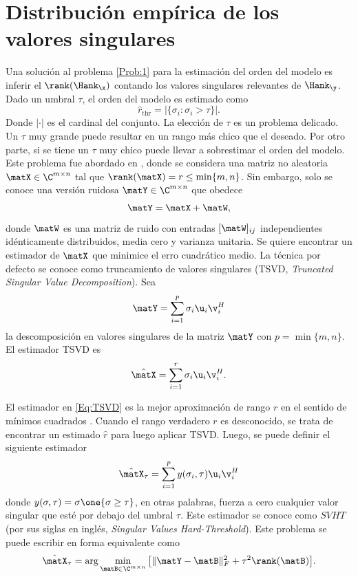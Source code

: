 \section{Distribución empírica de los valores singulares}
	Una solución al problema \eqref{Prob:1} para la estimación del orden del modelo es inferir el $\rank(\Hank_{\x})$ contando los valores singulares relevantes de $\Hank_{\y}$. Dado un umbral $\tau$, el orden del modelo es estimado como
	\begin{equation}
		\hat{r}_{\mathrm{thr}} = \big|\{\sigma_i:\sigma_i>\tau\}\big|.
		\label{Eq:rankThreshold}
	\end{equation}
	Donde $|\cdot|$ es el cardinal del conjunto. La elección de $\tau$ es un problema delicado. Un $\tau$ muy grande  puede resultar en un rango más chico que el deseado. Por otro parte, si se tiene un $\tau$ muy chico puede llevar a sobrestimar el orden del modelo. Este problema fue abordado en \cite{Gavish2014}, donde se considera una matriz no aleatoria $\matX\in\C^{m\times n}$ tal que $\rank(\matX)=r\le\min\{m,n\}$. Sin embargo, solo se conoce una versión ruidosa $\matY\in\C^{m\times n}$ que obedece
	\begin{equation}
		\matY = \matX + \matW,
		\label{Eq:NoisyMatrix}
	\end{equation}
	donde $\matW$ es una matriz de ruido con entradas $[\matW]_{ij}$ independientes idénticamente distribuidos, media cero y varianza unitaria. Se quiere encontrar un estimador de $\matX$ que minimice el erro cuadrático medio. La técnica por defecto se conoce como truncamiento de valores singulares (TSVD, \emph{Truncated Singular Value Decomposition}). Sea
	\begin{equation}
		\matY = \sum_{i=1}^{p}\sigma_i\u_i\v_i^H
		\label{Eq:SVDNoisyMatrix}
	\end{equation}
	la descomposición en valores singulares de la matriz $\matY$ con $p=\min\{m,n\}$. El estimador TSVD es
	\begin{equation}
		\hat{\matX} = \sum_{i=1}^r \sigma_i\u_i\v_i^H.
		\label{Eq:TSVD}
	\end{equation}
		
	El estimador en \eqref{Eq:TSVD} es la mejor aproximación de rango $r$ en el sentido de mínimos cuadrados \cite{Eckart1936}. Cuando el rango verdadero $r$ es desconocido, se trata de encontrar un estimado $\hat{r}$ para luego aplicar TSVD. Luego, se puede definir el siguiente estimador
	\begin{equation}
		\hat{\matX}_{\tau}= \sum_{i=1}^{p}y(\sigma_i,\tau)\u_i\v_i^H
		\label{Eq:HardThreshold}
	\end{equation}
	donde $y(\sigma,\tau) = \sigma\one\{\sigma\ge\tau\}$, en otras palabras, fuerza a cero cualquier valor singular que esté por debajo del umbral $\tau$. Este estimador se conoce como $SVHT$ (por sus siglas en inglés, \emph{Singular Values Hard-Threshold}). Este problema se puede escribir en forma equivalente como
	\begin{equation}
		\hat{\matX}_{\tau} = \arg\min_{\matB\in\C^{m\times n}} \big[\|\matY - \matB\|_F^2 + \tau^2\rank(\matB)\big].
		\label{Eq:PenalizedProblem}
	\end{equation}
		
